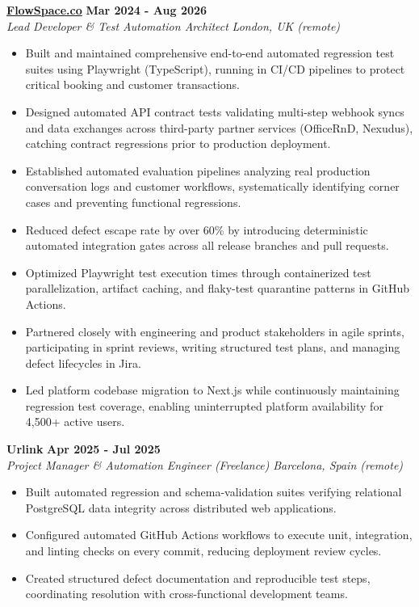 \documentclass[10pt,a4paper]{article}
\newcommand{\role}[4]{%
  \textbf{#1} \hfill \textbf{#2}\\[1pt]%
  \textit{#3} \hfill \textit{#4}\\[2pt]%
}
\begin{document}
\role{\href{https://flowspace.co}{FlowSpace.co}}{Mar 2024 - Aug 2026}{Lead Developer \& Test Automation Architect}{London, UK (remote)}
\begin{itemize}
  \item Built and maintained comprehensive end-to-end automated regression test suites using Playwright (TypeScript), running in CI/CD pipelines to protect critical booking and customer transactions.
  \item Designed automated API contract tests validating multi-step webhook syncs and data exchanges across third-party partner services (OfficeRnD, Nexudus), catching contract regressions prior to production deployment.
  \item Established automated evaluation pipelines analyzing real production conversation logs and customer workflows, systematically identifying corner cases and preventing functional regressions.
  \item Reduced defect escape rate by over 60\% by introducing deterministic automated integration gates across all release branches and pull requests.
  \item Optimized Playwright test execution times through containerized test parallelization, artifact caching, and flaky-test quarantine patterns in GitHub Actions.
  \item Partnered closely with engineering and product stakeholders in agile sprints, participating in sprint reviews, writing structured test plans, and managing defect lifecycles in Jira.
  \item Led platform codebase migration to Next.js while continuously maintaining regression test coverage, enabling uninterrupted platform availability for 4,500+ active users.
\end{itemize}

\role{Urlink}{Apr 2025 - Jul 2025}{Project Manager \& Automation Engineer (Freelance)}{Barcelona, Spain (remote)}
\begin{itemize}
  \item Built automated regression and schema-validation suites verifying relational PostgreSQL data integrity across distributed web applications.
  \item Configured automated GitHub Actions workflows to execute unit, integration, and linting checks on every commit, reducing deployment review cycles.
  \item Created structured defect documentation and reproducible test steps, coordinating resolution with cross-functional development teams.
\end{itemize}
\end{document}
